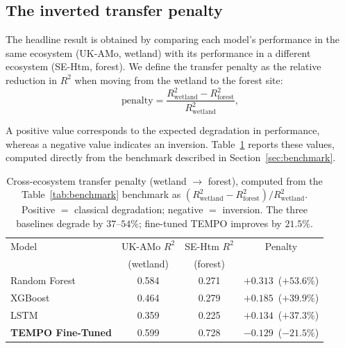 \documentclass[sigconf]{acmart}          %
\begin{document}
\subsection{The inverted transfer penalty}
\label{sec:inversion}

The headline result is obtained by comparing each model's performance in the
same ecosystem (UK-AMo, wetland) with its performance in a different ecosystem
(SE-Htm, forest). We define the transfer penalty as the relative reduction in
$R^2$ when moving from the wetland to the forest site:
\begin{equation}
\mathrm{penalty}
=
\frac{R^2_{\mathrm{wetland}} - R^2_{\mathrm{forest}}}
     {R^2_{\mathrm{wetland}}},
\label{eq:penalty}
\end{equation}

A positive value corresponds to the expected degradation in performance,
whereas a negative value indicates an inversion. Table~\ref{tab:penalty}
reports these values, computed directly from the benchmark described in
Section~\ref{sec:benchmark}.

\begin{table}[t]
  \centering
  \caption{Cross-ecosystem transfer penalty (wetland $\rightarrow$ forest),
  computed from the Table~\ref{tab:benchmark} benchmark as
  $(R^2_{\mathrm{wetland}}-R^2_{\mathrm{forest}})/R^2_{\mathrm{wetland}}$.
  Positive $=$ classical degradation; negative $=$ inversion. The three
  baselines degrade by $37$--$54\%$; fine-tuned TEMPO improves by $21.5\%$.}
  \label{tab:penalty}
  \small
  \begin{tabular}{@{}lccc@{}}
    \toprule
    Model & UK-AMo $R^2$ & SE-Htm $R^2$ & Penalty \\
          & (wetland) & (forest) &  \\
    \midrule
    Random Forest    & 0.584 & 0.271 & $+0.313$\ ($+53.6\%$) \\
    XGBoost          & 0.464 & 0.279 & $+0.185$\ ($+39.9\%$) \\
    LSTM             & 0.359 & 0.225 & $+0.134$\ ($+37.3\%$) \\
    \textbf{TEMPO Fine-Tuned} & 0.599 & 0.728 & $\mathbf{-0.129}$\ ($\mathbf{-21.5\%}$) \\
    \bottomrule
  \end{tabular}
\end{table}
\end{document}
